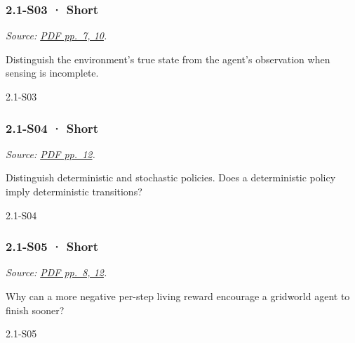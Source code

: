 \noindent\begin{minipage}{\linewidth}

\subsubsection{2.1-S03 · Short}\label{s03-short-3}

\emph{Source:
\href{../Lecture\%20Slides/2.1.\%20Introduction\%20to\%20Reinforcement\%20Learning.pdf\#page=7}{PDF
pp.~7, 10}.}

Distinguish the environment's true state from the agent's observation
when sensing is incomplete.

\begin{solution}[20mm]{2.1-S03}

\end{solution}
\end{minipage}\par\medskip

\noindent\begin{minipage}{\linewidth}

\subsubsection{2.1-S04 · Short}\label{s04-short-3}

\emph{Source:
\href{../Lecture\%20Slides/2.1.\%20Introduction\%20to\%20Reinforcement\%20Learning.pdf\#page=12}{PDF
pp.~12}.}

Distinguish deterministic and stochastic policies. Does a deterministic
policy imply deterministic transitions?

\begin{solution}[20mm]{2.1-S04}

\end{solution}
\end{minipage}\par\medskip

\noindent\begin{minipage}{\linewidth}

\subsubsection{2.1-S05 · Short}\label{s05-short-3}

\emph{Source:
\href{../Lecture\%20Slides/2.1.\%20Introduction\%20to\%20Reinforcement\%20Learning.pdf\#page=8}{PDF
pp.~8, 12}.}

Why can a more negative per-step living reward encourage a gridworld
agent to finish sooner?

\begin{solution}[20mm]{2.1-S05}

\end{solution}
\end{minipage}\par\medskip

